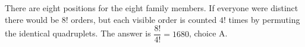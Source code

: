 There are eight positions for the eight family members. If everyone were distinct there would be $8!$ orders, but each visible order is counted $4!$ times by permuting the identical quadruplets. The answer is $\dfrac{8!}{4!}=\boxed{1680}$, choice A.
